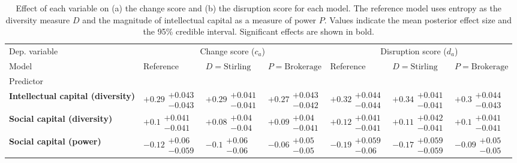 \begin{table}[H]
\centering
\caption{Effect of each variable on (a) the change score and (b) the disruption score for each model. The reference model uses entropy as the diversity measure $D$ and the magnitude of intellectual capital as a measure of power $P$. Values indicate the mean posterior effect size and the 95\% credible interval. Significant effects are shown in bold.}
\label{table:summary_change_disruption}
\renewcommand{\arraystretch}{2}\fontsize{6}{7}\selectfont\begin{tabular}{lllllll}
\toprule
Dep. variable & \multicolumn{3}{c}{Change score ($c_a$)} & \multicolumn{3}{c}{Disruption score ($d_a$)} \\
Model &                                Reference &                      $D=\text{Stirling}$ &                     $P=\text{Brokerage}$ &                                Reference &                      $D=\text{Stirling}$ &                     $P=\text{Brokerage}$ \\
Predictor                                 &                                          &                                          &                                          &                                          &                                          &                                          \\
\midrule
\textbf{Intellectual capital (diversity)} &  $\bm{+0.29}\substack{+0.043 \\ -0.043}$ &  $\bm{+0.29}\substack{+0.041 \\ -0.041}$ &  $\bm{+0.27}\substack{+0.043 \\ -0.042}$ &  $\bm{+0.32}\substack{+0.044 \\ -0.044}$ &  $\bm{+0.34}\substack{+0.041 \\ -0.041}$ &   $\bm{+0.3}\substack{+0.044 \\ -0.043}$ \\
\textbf{Social capital (diversity)}       &   $\bm{+0.1}\substack{+0.041 \\ -0.041}$ &    $\bm{+0.08}\substack{+0.04 \\ -0.04}$ &   $\bm{+0.09}\substack{+0.04 \\ -0.041}$ &  $\bm{+0.12}\substack{+0.041 \\ -0.041}$ &  $\bm{+0.11}\substack{+0.042 \\ -0.041}$ &   $\bm{+0.1}\substack{+0.041 \\ -0.041}$ \\
\textbf{Social capital (power)}           &   $\bm{-0.12}\substack{+0.06 \\ -0.059}$ &     $\bm{-0.1}\substack{+0.06 \\ -0.06}$ &    $\bm{-0.06}\substack{+0.05 \\ -0.05}$ &   $\bm{-0.19}\substack{+0.059 \\ -0.06}$ &  $\bm{-0.17}\substack{+0.059 \\ -0.059}$ &    $\bm{-0.09}\substack{+0.05 \\ -0.05}$ \\

\end{tabular}
\end{table}
